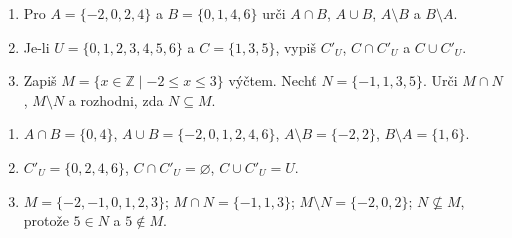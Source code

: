 \documentclass[11pt,a4paper]{article}
\begin{document}
\begin{zadaniReseniBox}[title={Domácí úkol}]
\begin{enumerate}[label=\alph*)]
\item Pro $A=\{-2,0,2,4\}$ a $B=\{0,1,4,6\}$ urči
$A\cap B$, $A\cup B$, $A\setminus B$ a $B\setminus A$.
\item Je-li $U=\{0,1,2,3,4,5,6\}$ a $C=\{1,3,5\}$,
vypiš $C'_U$, $C\cap C'_U$ a $C\cup C'_U$.
\item Zapiš $M=\{x\in\mathbb Z\mid -2\le x\le3\}$ výčtem.
Nechť $N=\{-1,1,3,5\}$. Urči $M\cap N$, $M\setminus N$ a
rozhodni, zda $N\subseteq M$.
\end{enumerate}
\tcblower
\begin{enumerate}[label=\alph*)]
\item $A\cap B=\{0,4\}$,
$A\cup B=\{-2,0,1,2,4,6\}$,
$A\setminus B=\{-2,2\}$,
$B\setminus A=\{1,6\}$.
\item $C'_U=\{0,2,4,6\}$,
$C\cap C'_U=\varnothing$, $C\cup C'_U=U$.
\item $M=\{-2,-1,0,1,2,3\}$;
$M\cap N=\{-1,1,3\}$;
$M\setminus N=\{-2,0,2\}$;
$N\nsubseteq M$, protože $5\in N$ a $5\notin M$.
\end{enumerate}
\end{zadaniReseniBox}

\end{document}
